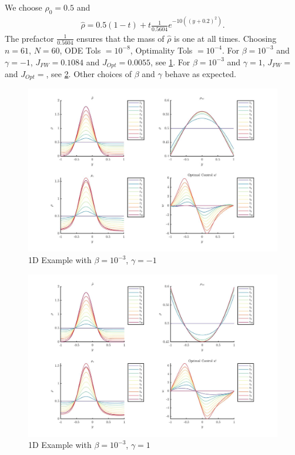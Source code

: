 \documentclass[11pt, a4paper]{article}
\theoremstyle{definition}
\begin{document}
We choose $\rho_0 = 0.5$ and
\begin{align*}
\hat \rho = 0.5(1-t)  + t\frac{1}{0.5604}e^{-10((y+0.2)^2)}.
\end{align*}
The prefactor $\frac{1}{0.5604}$ ensures that the mass of $\hat \rho$ is one at all times. Choosing $n = 61$, $N = 60$, ODE Tols $ = 10^{-8}$, Optimality Tols $= 10^{-4}$.
For $\beta = 10^{-3}$ and $\gamma = -1$, $J_{FW} = 0.1084$ and $J_{Opt} = 0.0055$, see \ref{FigExG1}.
For $\beta = 10^{-3}$ and $\gamma = 1$, $J_{FW} = $ and $J_{Opt} = $, see \ref{FigExG2}. Other choices of $\beta$ and $\gamma$ behave as expected.
\begin{figure}[h]
	\includegraphics[scale=0.3]{ExG1.jpg}
	\caption{1D Example with $\beta = 10^{-3}$, $\gamma = -1$}
	\label{FigExG1}
\end{figure}
\begin{figure}[h]
	\includegraphics[scale=0.3]{ExG2.jpg}
	\caption{1D Example with $\beta = 10^{-3}$, $\gamma = 1$}
	\label{FigExG2}
\end{figure}
\end{document}
